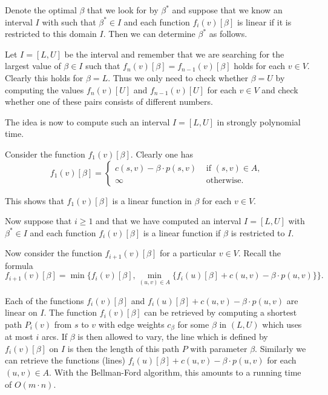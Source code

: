 Denote the optimal $\beta$ that we look for by $\beta^*$ and suppose that we
know an interval $I$ with such that $\beta^* \in I$ and each function
$f_i(v)[\beta]$ is linear if it is restricted to this domain $I$. Then we
can determine $\beta^*$ as follows.

Let $I = [L,U]$ be the interval and  remember that we are searching for the
largest value of $\beta \in I$ such that $f_{n}(v)[\beta]=f_{n-1}(v)[\beta]$
holds for each $v \in V$. Clearly this holds for $\beta = L$. Thus we only
need to check whether $\beta = U$ by computing the values $f_{n}(v)[U]$
and $f_{n-1}(v)[U]$ for each $v \in V$ and check whether one of these
pairs consists of different numbers. 


The idea is now to compute such an interval $I = [L,U]$ in strongly
polynomial time. 

Consider the function $f_1(v)[\beta]$. Clearly one has 
\begin{displaymath}
f_1(v)[\beta] = 
  \begin{cases}
    c(s,v) - \beta \cdot p(s,v) &  \text{ if } (s,v)\in A, \\
    \infty                  & \text{ otherwise}. 
  \end{cases}
\end{displaymath}

This shows that $f_1(v)[\beta]$ is a linear function in $\beta$ for each $v
\in V$. 

Now suppose that $i\geq1$ and that we have computed an interval
$I=[L,U]$ with  $\beta^*\in I$ and each function $f_i(v)[\beta]$ is a linear
function if $\beta$ is restricted to $I$. 

Now consider the function  $f_{i+1}(v)[\beta]$ for a particular $v \in
V$. Recall the formula 
\begin{equation}
  \label{eq:1}
  f_{i+1}(v)[\beta] = \min\{ f_i(v)[\beta], \min_{(u,v)\in A} \{ f_i(u)[\beta] +
  c(u,v) - \beta \cdot p(u,v)\} \}. 
\end{equation}


Each of the functions $ f_i(v)[\beta]$ and $ f_i(u)[\beta] +  c(u,v) - \beta
\cdot p(u,v)$  are linear on $I$.  The function $f_i(v)[\beta]$ can be retrieved by
computing a shortest path $P_i(v)$ from $s$ to $v$ with edge weights $c_\beta$ for
some $\beta$ in $(L,U)$ which uses at most $i$ arcs. If $\beta$ is then
allowed to vary, the line which is defined by $f_i(v)[\beta]$ on $I$ is
then the length of this path $P$   with parameter $\beta$.  Similarly we
can retrieve the functions (lines) $ f_i(u)[\beta] +  c(u,v) - \beta
\cdot p(u,v)$  for each $(u,v) \in A$. With the Bellman-Ford algorithm,
this amounts to a running time of $O(m \cdot n)$. 

